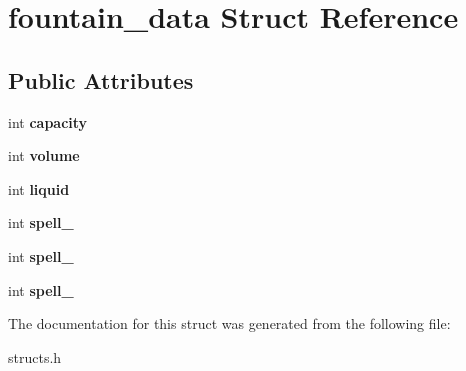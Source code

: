 \hypertarget{structfountain__data}{\section{fountain\-\_\-data Struct Reference}
\label{structfountain__data}
}
\subsection*{Public Attributes}
\begin{DoxyCompactItemize}
\item 
\hypertarget{structfountain__data_a8ba520a6a8cc4ab2c6167e43bb914122}{int {\bfseries capacity}}\label{structfountain__data_a8ba520a6a8cc4ab2c6167e43bb914122}

\item 
\hypertarget{structfountain__data_ac08752e636ab5a427ff7d7ac83183bd9}{int {\bfseries volume}}\label{structfountain__data_ac08752e636ab5a427ff7d7ac83183bd9}

\item 
\hypertarget{structfountain__data_a006ae5eac053f0c50a1667e9bf39adbc}{int {\bfseries liquid}}\label{structfountain__data_a006ae5eac053f0c50a1667e9bf39adbc}

\item 
\hypertarget{structfountain__data_a4395698ebcfb50308bbe6892de853bd0}{int {\bfseries spell\-\_}}\label{structfountain__data_a4395698ebcfb50308bbe6892de853bd0}

\item 
\hypertarget{structfountain__data_aa9c2312107a9f55a29185d73f224efd5}{int {\bfseries spell\-\_}}\label{structfountain__data_aa9c2312107a9f55a29185d73f224efd5}

\item 
\hypertarget{structfountain__data_adf2c8f707cd32b9efd5f6a0aa69bcbef}{int {\bfseries spell\-\_}}\label{structfountain__data_adf2c8f707cd32b9efd5f6a0aa69bcbef}

\end{DoxyCompactItemize}


The documentation for this struct was generated from the following file\-:\begin{DoxyCompactItemize}
\item 
structs.\-h\end{DoxyCompactItemize}
